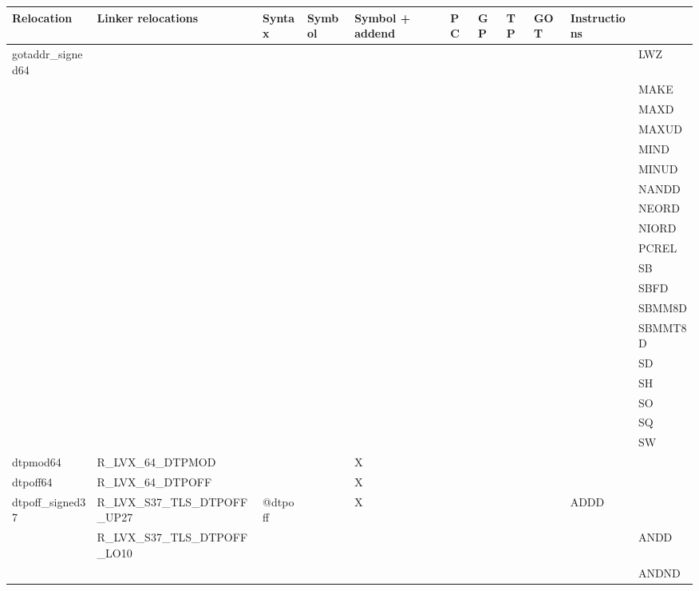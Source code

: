 {\tiny
\begin{tabular}{|l|l|l|l|l|l|l|l|l|l|l|} \hline
\textsf{Relocation} & \textsf{Linker relocations} & \textsf{Syntax} & \textsf{Symbol} & \textsf{Symbol + addend} & \textsf{PC} & \textsf{GP} & \textsf{TP} & \textsf{GOT} & \textsf{Instructions} \\
\hline
\textsf{gotaddr\_signed64} & & & & & & & & & & \textsf{LWZ} \\
 & & & & & & & & & & \textsf{MAKE} \\
 & & & & & & & & & & \textsf{MAXD} \\
 & & & & & & & & & & \textsf{MAXUD} \\
 & & & & & & & & & & \textsf{MIND} \\
 & & & & & & & & & & \textsf{MINUD} \\
 & & & & & & & & & & \textsf{NANDD} \\
 & & & & & & & & & & \textsf{NEORD} \\
 & & & & & & & & & & \textsf{NIORD} \\
 & & & & & & & & & & \textsf{PCREL} \\
 & & & & & & & & & & \textsf{SB} \\
 & & & & & & & & & & \textsf{SBFD} \\
 & & & & & & & & & & \textsf{SBMM8D} \\
 & & & & & & & & & & \textsf{SBMMT8D} \\
 & & & & & & & & & & \textsf{SD} \\
 & & & & & & & & & & \textsf{SH} \\
 & & & & & & & & & & \textsf{SO} \\
 & & & & & & & & & & \textsf{SQ} \\
 & & & & & & & & & & \textsf{SW} \\
\hline
\textsf{dtpmod64} & \textsf{R\_LVX\_64\_DTPMOD} & \textsf{} & \textsf{} & \textsf{X} & \textsf{} & \textsf{} & \textsf{} & \textsf{} & \textsf{} \\
\hline
\textsf{dtpoff64} & \textsf{R\_LVX\_64\_DTPOFF} & \textsf{} & \textsf{} & \textsf{X} & \textsf{} & \textsf{} & \textsf{} & \textsf{} & \textsf{} \\
\hline
\textsf{dtpoff\_signed37} & \textsf{R\_LVX\_S37\_TLS\_DTPOFF\_UP27} & \textsf{@dtpoff} & \textsf{} & \textsf{X} & \textsf{} & \textsf{} & \textsf{} & \textsf{} & \textsf{ADDD} \\
 & \textsf{R\_LVX\_S37\_TLS\_DTPOFF\_LO10} & & & & & & & & & \textsf{ANDD} \\
 & & & & & & & & & & \textsf{ANDND} \\

\end{tabular}}
